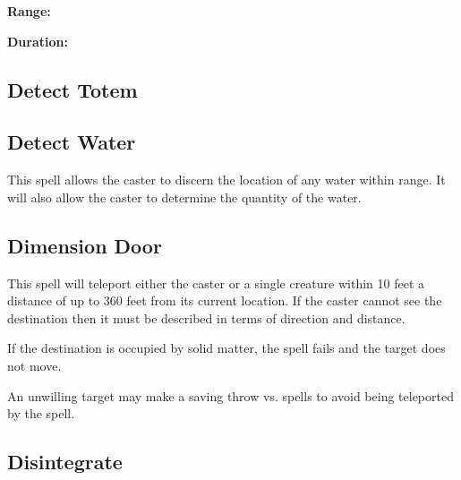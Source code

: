 \begin{multicols*}{2}
{\textbf{Range:}

\textbf{Duration:} }


\subsection{Detect Totem}\label{spell:Detect Totem}


\subsection{Detect Water}\label{spell:Detect Water}

This spell allows the caster to discern the location of any water within range. It will also allow the caster to determine the quantity of the water.

\subsection{Dimension Door}\label{spell:Dimension Door}

This spell will teleport either the caster or a single creature within 10 feet a distance of up to 360 feet from its current location. If the caster cannot see the destination then it must be described in terms of direction and distance.

If the destination is occupied by solid matter, the spell fails and the target does not move.

An unwilling target may make a saving throw vs. spells to avoid being teleported by the spell.

\subsection{Disintegrate}\label{spell:Disintegrate}
\end{multicols*}
